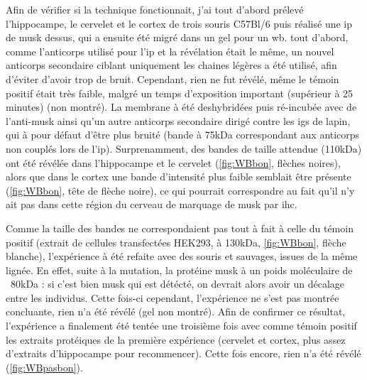 	Afin de vérifier si la technique fonctionnait, j'ai tout d'abord prélevé l'hippocampe, le cervelet et le cortex de trois souris C57Bl/6 puis réalisé une \gls{ip} de \gls{musk} dessus, qui a ensuite été migré dans un gel pour un \gls{wb}. tout d'abord, comme l'anticorps utilisé pour l'\gls{ip} et la révélation était le même, un nouvel anticorps secondaire ciblant uniquement les chaines légères a été utilisé, afin d'éviter d'avoir trop de bruit. Cependant, rien ne fut révélé, même le témoin positif était très faible, malgré un temps d'exposition important (supérieur à 25 minutes) (non montré). La membrane à été deshybridées puis ré-incubée avec de l'anti-\gls{musk} ainsi qu'un autre anticorps secondaire dirigé contre les \glspl{ig} de lapin, qui à pour défaut d'être plus bruité (bande à 75kDa correspondant aux anticorps non couplés lors de l'\gls{ip}). Surprenamment, des bandes de taille attendue (110kDa) ont été révélée dans l'hippocampe et le cervelet (\cref{fig:WBbon}, flèches noires), alors que dans le cortex une bande d'intensité plus faible semblait être présente (\cref{fig:WBbon}, tête de flèche noire), ce qui pourrait correspondre au fait qu'il n'y ait pas dans cette région du cerveau de marquage de \gls{musk} par \gls{ihc}. 
	
	Comme la taille des bandes ne correspondaient pas tout à fait à celle du témoin positif (extrait de cellules transfectées HEK293, à 130kDa, \cref{fig:WBbon}, flèche blanche), l'expérience à été refaite avec des souris \mcrd et sauvages, issues de la même lignée. En effet, suite à la mutation, la protéine \gls{musk} à un poids moléculaire de ~80kDa : si c'est bien \gls{musk} qui est détécté, on devrait alors avoir un décalage entre les individus. Cette fois-ci cependant, l'expérience ne s'est pas montrée concluante, rien n'a été révélé (gel non montré). Afin de confirmer ce résultat, l'expérience a finalement été tentée une troisième fois avec comme témoin positif les extraits protéiques de la première expérience (cervelet et cortex, plus assez d'extraits d'hippocampe pour recommencer). Cette fois encore, rien n'a été révélé (\cref{fig:WBpasbon}).
		

